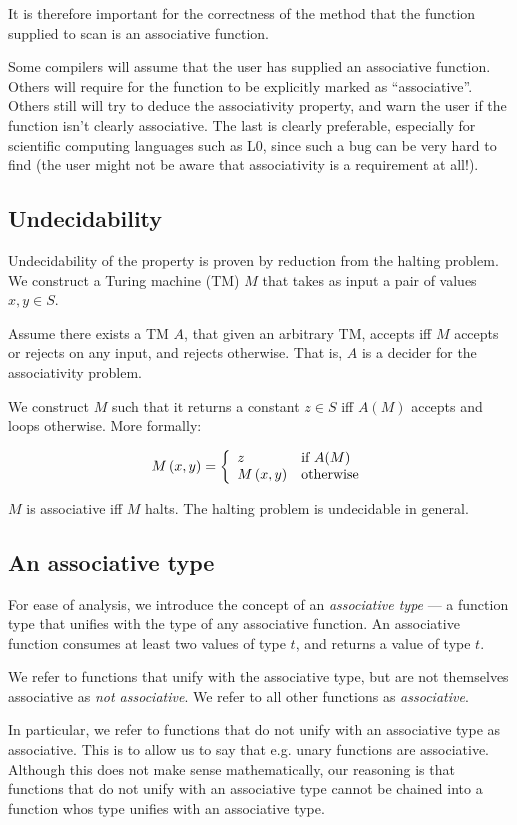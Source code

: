 It is therefore important for the correctness of the method that the function
supplied to scan is an associative function.

Some compilers will assume that the user has supplied an associative function.
Others will require for the function to be explicitly marked as
``associative''. Others still will try to deduce the associativity property,
and warn the user if the function isn't clearly associative. The last is clearly
preferable, especially for scientific computing languages such as L0, since such a bug can
be very hard to find (the user might not be aware that associativity is a requirement at
all!).

\subsection{Undecidability}

Undecidability of the property is proven by reduction from the halting
problem. We construct a Turing machine (TM) $M$ that takes as input a pair of values $x,y\in S$.

Assume there exists a TM $A$, that given an arbitrary TM, accepts iff $M$
accepts or rejects on any input, and rejects otherwise. That is, $A$ is a
decider for the associativity problem.

We construct $M$ such that it returns a constant $z\in S$ iff $A(M)$ accepts
and loops otherwise. More formally:

\[M\left({x,y}\right) = \left\{ \begin{array}{l l} z & \text{if $A(M)$} \\ M\left({x,y}\right) &
\text{otherwise} \end{array} \right.\]

$M$ is associative iff $M$ halts. The halting problem is undecidable in
general.

\subsection{An associative type}

For ease of analysis, we introduce the concept of an \emph{associative type}
--- a function type that unifies with the type of any associative function. An
associative function consumes at least two values of type $t$, and returns a
value of type $t$.

We refer to functions that unify with the associative type, but are not
themselves associative as \emph{not associative}. We refer to all other
functions as \emph{associative}.

In particular, we refer to functions that do not unify with an associative type
as associative. This is to allow us to say that e.g. unary functions are
associative. Although this does not make sense mathematically, our reasoning is
that functions that do not unify with an associative type cannot be chained
into a function whos type unifies with an associative type.

